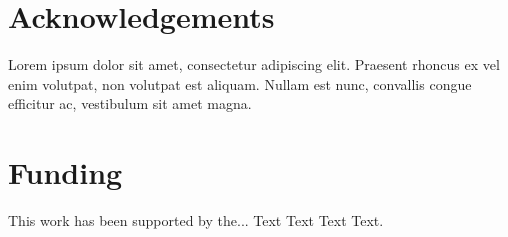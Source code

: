\documentclass{bioinfo}
\begin{document}
\section*{Acknowledgements}

Lorem ipsum dolor sit amet, consectetur adipiscing elit. Praesent 
rhoncus ex vel enim volutpat, non volutpat est aliquam. Nullam est 
nunc, convallis congue efficitur ac, vestibulum sit amet magna.
\vspace*{-12pt}

\section*{Funding}

This work has been supported by the... Text Text  Text Text.\vspace*{-12pt}


%
%
%
%
%
%
%

\end{document}
